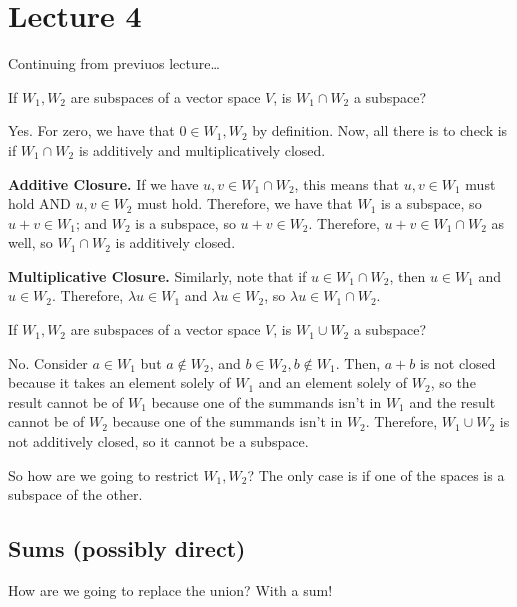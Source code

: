 \documentclass{book}
\begin{document}
\section{Lecture 4}
Continuing from previuos lecture\dots 

\begin{example}
	If $W_1, W_2$ are subspaces of a vector space $V$, is $W_1 \cap W_2$ a subspace?
\end{example}

\begin{solution} 
	Yes. For zero, we have that $0 \in W_1, W_2$ by definition. Now, all there is to check is if $W_1 \cap W_2$ is additively and multiplicatively closed.

	\textbf{Additive Closure.} If we have $u, v \in W_1 \cap W_2$, this means that $u, v \in W_1$ must hold AND $u, v \in W_2$ must hold. Therefore, we have that $W_1$ is a subspace, so $u + v \in W_1$; and $W_2$ is a subspace, so $u + v \in W_2$. Therefore, $u + v \in W_1 \cap W_2$ as well, so $W_1 \cap W_2$ is additively closed.

	\textbf{Multiplicative Closure.} Similarly, note that if $u \in W_1 \cap W_2$, then $u \in W_1$ and $u \in W_2$. Therefore, $\lambda u \in W_1$ and $\lambda u \in W_2$, so $\lambda u \in W_1 \cap W_2$.
\end{solution}

\begin{example}
	If $W_1, W_2$ are subspaces of a vector space $V$, is $W_1 \cup W_2$ a subspace?
\end{example}

\begin{solution}
	No. Consider $a \in W_1$ but $a \not\in W_2$, and $b \in W_2, b \not\in W_1$. Then, $a + b$ is not closed because it takes an element solely of $W_1$ and an element solely of $W_2$, so the result cannot be of $W_1$ because one of the summands isn't in $W_1$ and the result cannot be of $W_2$ because one of the summands isn't in $W_2$. Therefore, $W_1 \cup W_2$ is not additively closed, so it cannot be a subspace.
\end{solution}

So how are we going to restrict $W_1, W_2$? The only case is if one of the spaces is a subspace of the other.

\subsection{Sums (possibly direct)}
How are we going to replace the union? With a sum!
\end{document}
